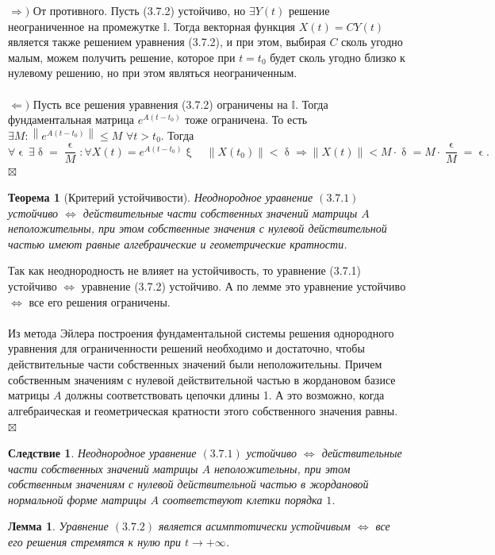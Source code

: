 \documentclass[a4paper, 12pt]{report}
\newenvironment{Proof} %
{\par\noindent{$\blacklozenge$}} %
{\hfill$\scriptstyle\boxtimes$}
\newcommand{\I}{\mathbb{I}}
\renewcommand{\leq}{\leqslant}
\renewcommand{\delta}{\updelta}
\renewcommand{\xi}{\upxi}
\renewcommand{\epsilon}{\upvarepsilon}
\newcommand\Norm[1]{\left\| #1 \right\|}
\newtheorem*{theorem}{Теорема}
\newtheorem*{cor}{Следствие}
\newtheorem*{lem}{Лемма}
\begin{document}
\begin{Proof}
	$\Rightarrow)$ От противного. Пусть (3.7.2) устойчиво, но $\exists Y(t)$ решение неограниченное на промежутке $\I$. Тогда векторная функция $X(t) = CY(t)$ является также решением уравнения (3.7.2), и при этом, выбирая $C$ сколь угодно малым, можем получить решение, которое при $t=t_0$ будет сколь угодно близко к нулевому решению, но при этом являться неограниченным.\\\\
	$\Leftarrow)$ Пусть все решения уравнения (3.7.2) ограничены на $\I$. Тогда фундаментальная матрица $e^{A(t-t_0)}$ тоже ограничена. То есть $\exists M : \Norm{e^{A(t-t_0)}}\leq M$ $\forall t > t_0$. Тогда $$\forall \epsilon\ \exists \delta = \dfrac{\epsilon}{M} : \forall X(t)=e^{A(t-t_0)}\xi\quad \Norm{X(t_0)} < \delta \Rightarrow \Norm{X(t)} < M\cdot \delta = M\cdot \dfrac{\epsilon}{M} = \epsilon.$$
\end{Proof}
\begin{theorem}
	[Критерий устойчивости]
	Неоднородное уравнение $(3.7.1)$ устойчиво $\Longleftrightarrow$ действительные части собственных значений матрицы $A$ неположительны, при этом собственные значения с нулевой действительной частью имеют равные алгебраические и геометрические кратности.
\end{theorem}\begin{Proof}
Так как неоднородность не влияет на устойчивость, то уравнение (3.7.1) устойчиво $\Longleftrightarrow$ уравнение (3.7.2) устойчиво. А по лемме это уравнение устойчиво $\Longleftrightarrow$ все его решения ограничены.\\\\
Из метода Эйлера построения фундаментальной системы решения однородного уравнения для ограниченности решений необходимо и достаточно, чтобы действительные части собственных значений были неположительны. Причем собственным значениям с нулевой действительной частью в жордановом базисе матрицы $A$ должны соответствовать цепочки длины 1. А это возможно, когда алгебраическая и геометрическая кратности этого собственного значения равны.
\end{Proof}
\begin{cor}
	Неоднородное уравнение $(3.7.1)$ устойчиво $\Longleftrightarrow$ действительные части собственных значений матрицы $A$ неположительны, при этом собственным значениям с нулевой действительной частью в жордановой нормальной форме матрицы $A$ соответствуют клетки порядка $1$.
\end{cor}
\begin{lem}
	Уравнение $(3.7.2)$ является асимптотически устойчивым $\Longleftrightarrow$ все его решения стремятся к нулю при $t \rightarrow + \infty$.
\end{lem}
\end{document}
